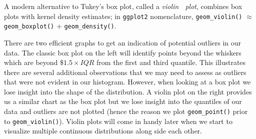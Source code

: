 \documentclass[]{book}
\newenvironment{Shaded}{\begin{snugshade}}{\end{snugshade}}
\newcommand{\CommentTok}[1]{\textcolor[rgb]{0.56,0.35,0.01}{\textit{#1}}}
\newcommand{\DataTypeTok}[1]{\textcolor[rgb]{0.13,0.29,0.53}{#1}}
\newcommand{\DecValTok}[1]{\textcolor[rgb]{0.00,0.00,0.81}{#1}}
\newcommand{\FloatTok}[1]{\textcolor[rgb]{0.00,0.00,0.81}{#1}}
\newcommand{\KeywordTok}[1]{\textcolor[rgb]{0.13,0.29,0.53}{\textbf{#1}}}
\newcommand{\NormalTok}[1]{#1}
\newcommand{\OperatorTok}[1]{\textcolor[rgb]{0.81,0.36,0.00}{\textbf{#1}}}
\newcommand{\StringTok}[1]{\textcolor[rgb]{0.31,0.60,0.02}{#1}}
\theoremstyle{definition}
\theoremstyle{definition}
\theoremstyle{definition}
\theoremstyle{remark}
\begin{document}
A modern alternative to Tukey's box plot, called a \emph{violin} 🎻
\emph{plot}, combines box plots with kernel density estimates; in
\texttt{ggplot2} nomenclature, \texttt{geom\_violin()} \(\approx\)
\texttt{geom\_boxplot()} + \texttt{geom\_density()}.

There are two efficient graphs to get an indication of potential
outliers in our data. The classic box plot on the left will identify
points beyond the whiskers which are beyond \(\$1.5 \times IQR\) from
the first and third quantile. This illustrates there are several
additional observations that we may need to assess as outliers that were
not evident in our histogram. However, when looking at a box plot we
lose insight into the shape of the distribution. A violin plot on the
right provides us a similar chart as the box plot but we lose insight
into the quantiles of our data and outliers are not plotted (hence the
reason we plot \texttt{geom\_point()} prior to \texttt{geom\_violin()}).
Violin plots will come in handy later when we start to visualize
multiple continuous distributions along side each other.

\begin{Shaded}
\end{Shaded}
\end{document}
